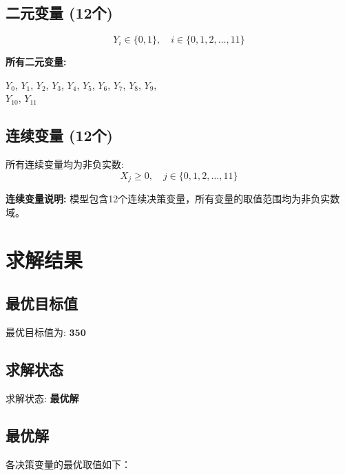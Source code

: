 \documentclass[a4paper,10pt]{article}
\begin{document}
\subsection{二元变量 (12个)}

\begin{equation}
Y_i \in \{0,1\}, \quad i \in \{0, 1, 2, \ldots, 11\}
\end{equation}

\textbf{所有二元变量:}

{\small
$Y_{0}$, $Y_{1}$, $Y_{2}$, $Y_{3}$, $Y_{4}$, $Y_{5}$, $Y_{6}$, $Y_{7}$, $Y_{8}$, $Y_{9}$, \\
$Y_{10}$, $Y_{11}$
}

\subsection{连续变量 (12个)}

所有连续变量均为非负实数:
\begin{equation}
X_j \geq 0, \quad j \in \{0, 1, 2, \ldots, 11\}
\end{equation}

\textbf{连续变量说明:} 模型包含12个连续决策变量，所有变量的取值范围均为非负实数域。

\section{求解结果}

\subsection{最优目标值}

最优目标值为: $\mathbf{350}$

\subsection{求解状态}

求解状态: \textbf{最优解}

\subsection{最优解}

各决策变量的最优取值如下：
\end{document}
